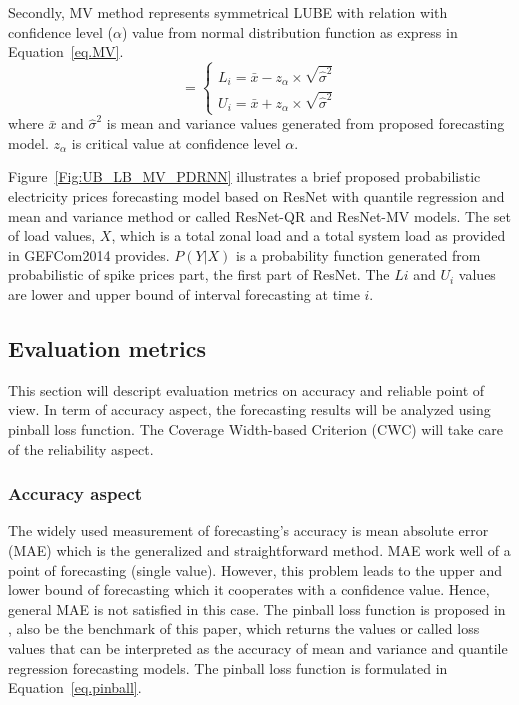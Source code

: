 \documentclass[review]{elsarticle}
\begin{document}
      Secondly, MV method represents symmetrical LUBE with relation with confidence level ($\alpha$) value from normal distribution function as express in Equation~\ref{eq.MV}.
      \begin{equation}
        [L_{i}, U_{i}]=
        \begin{cases}
          L_{i}=\bar{x} - z_{\alpha} \times \sqrt{\hat{\sigma}^2}\\
          U_{i}=\bar{x} + z_{\alpha} \times \sqrt{\hat{\sigma}^2}
        \end{cases}
        \label{eq.MV}
      \end{equation}
      where $\bar{x}$ and $\hat{\sigma}^2$ is mean and variance values generated from proposed forecasting model. $z_{\alpha}$ is critical value at confidence level $\alpha$.


      Figure~\ref{Fig:UB_LB_MV_PDRNN} illustrates a brief proposed probabilistic electricity prices forecasting model based on ResNet with quantile regression and mean and variance method or called ResNet-QR and ResNet-MV models.
      The set of load values, $X$, which is a total zonal load and a total system load as provided in GEFCom2014 provides.
      $P(Y|X)$ is a probability function generated from probabilistic of spike prices part, the first part of ResNet.
      The $L{i}$ and $U_{i}$ values are lower and upper bound of interval forecasting at time $i$.


      \subsection{Evaluation metrics}
        This section will descript evaluation metrics on accuracy and reliable point of view.
        In term of accuracy aspect, the forecasting results will be analyzed using pinball loss function.
        The Coverage Width-based Criterion (CWC) will take care of the reliability aspect.

        \subsubsection{Accuracy aspect}
          The widely used measurement of forecasting's accuracy is mean absolute error (MAE) which is the generalized and straightforward method.
          MAE work well of a point of forecasting (single value).
          However, this problem leads to the upper and lower bound of forecasting which it cooperates with a confidence value.
          Hence, general MAE is not satisfied in this case.
          The pinball loss function is proposed in \cite{Maciejowska2016}, also be the benchmark of this paper, which returns the values or called loss values that can be interpreted as the accuracy of mean and variance and quantile regression forecasting models.
          The pinball loss function is formulated in Equation~\ref{eq.pinball}.
\end{document}
